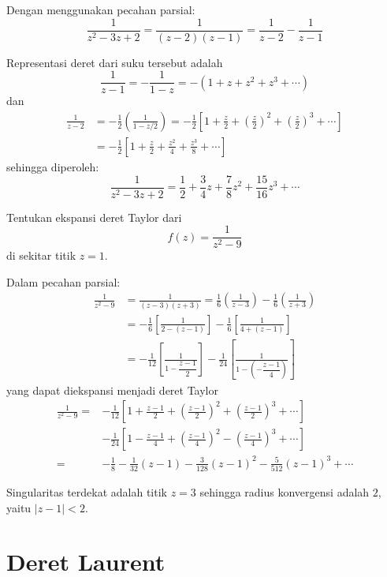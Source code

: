 Dengan menggunakan pecahan parsial:
\[
\frac{1}{z^{2}-3z+2}=\frac{1}{(z-2)(z-1)}=\frac{1}{z-2}-\frac{1}{z-1}
\]

Representasi deret dari suku tersebut adalah
\[
\frac{1}{z-1}=-\frac{1}{1-z}=-(1+z+z^{2}+z^{3}+\cdots)
\]
dan
\begin{align*}
\frac{1}{z-2} & =-\frac{1}{2}\left(\frac{1}{1-z/2}\right)=-\frac{1}{2}\left[1+\frac{z}{2}+\left(\frac{z}{2}\right)^{2}+\left(\frac{z}{2}\right)^{3}+\cdots\right]\\
 & =-\frac{1}{2}\left[1+\frac{z}{2}+\frac{z^{2}}{4}+\frac{z^{3}}{8}+\cdots\right]
\end{align*}
sehingga diperoleh:
\[
\frac{1}{z^{2}-3z+2}=\frac{1}{2}+\frac{3}{4}z+\frac{7}{8}z^{2}+\frac{15}{16}z^{3}+\cdots
\]


\begin{contoh}
Tentukan ekspansi deret Taylor dari
\[
f(z)=\frac{1}{z^{2}-9}
\]
di sekitar titik $z=1$.
\end{contoh}

Dalam pecahan parsial:
\begin{align*}
\frac{1}{z^{2}-9} & =\frac{1}{(z-3)(z+3)}=\frac{1}{6}\left(\frac{1}{z-3}\right)-\frac{1}{6}\left(\frac{1}{z+3}\right)\\
 & =-\frac{1}{6}\left[\frac{1}{2-(z-1)}\right]-\frac{1}{6}\left[\frac{1}{4+(z-1)}\right]\\
 & =-\frac{1}{12}\left[\frac{1}{1-\dfrac{z-1}{2}}\right]-\frac{1}{24}\left[\frac{1}{1-\left(-\dfrac{z-1}{4}\right)}\right]
\end{align*}
yang dapat diekspansi menjadi deret Taylor
\begin{align*}
\frac{1}{z^{2}-9}= & -\frac{1}{12}\left[1+\frac{z-1}{2}+\left(\frac{z-1}{2}\right)^{2}+\left(\frac{z-1}{2}\right)^{3}+\cdots\right]\\
 & -\frac{1}{24}\left[1-\frac{z-1}{4}+\left(\frac{z-1}{4}\right)^{2}-\left(\frac{z-1}{4}\right)^{3}+\cdots\right]\\
= & -\frac{1}{8}-\frac{1}{32}(z-1)-\frac{3}{128}(z-1)^{2}-\frac{5}{512}(z-1)^{3}+\cdots
\end{align*}

Singularitas terdekat adalah titik $z=3$ sehingga radius konvergensi
adalah $2$, yaitu $|z-1|<2$.



\section{Deret Laurent}

